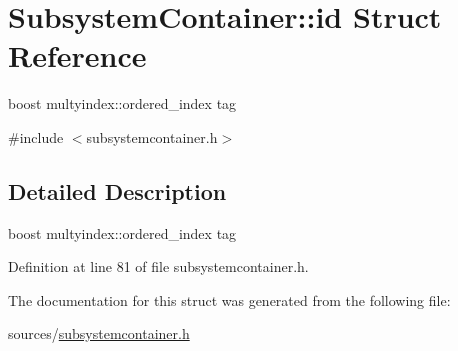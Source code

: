 \hypertarget{structSubsystemContainer_1_1id}{
\section{SubsystemContainer::id Struct Reference}
\label{structSubsystemContainer_1_1id}
}


boost multyindex::ordered\_\-index tag  




{\ttfamily \#include $<$subsystemcontainer.h$>$}



\subsection{Detailed Description}
boost multyindex::ordered\_\-index tag 

Definition at line 81 of file subsystemcontainer.h.



The documentation for this struct was generated from the following file:\begin{DoxyCompactItemize}
\item 
sources/\hyperlink{subsystemcontainer_8h}{subsystemcontainer.h}\end{DoxyCompactItemize}
